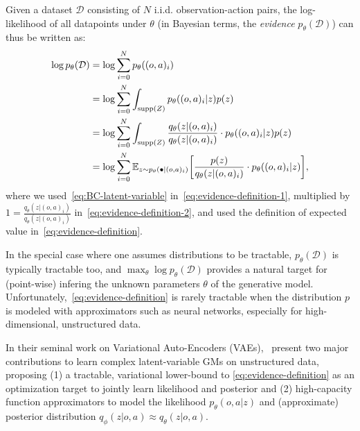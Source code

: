 Given a dataset \( \mathcal D \) consisting of \( N \) i.i.d. observation-action pairs, the log-likelihood of all datapoints under \( \theta \) (in Bayesian terms, the \emph{evidence} \( p_\theta(\mathcal D)\)) can thus be written as:
\begin{align}
    \log p_\theta(\mathcal D) &= \log \sum_{i=0}^N p_\theta ((o,a)_i) \label{eq:evidence-definition-1}\\
                              &= \log \sum_{i=0}^N \int_{\supp{Z}} p_\theta((o,a)_i \vert z) p(z) \label{eq:evidence-definition-2}\\
                              &= \log \sum_{i=0}^N \int_{\supp{Z}} \frac{q_\theta(z \vert (o,a)_i)}{q_\theta(z \vert (o,a)_i)} \cdot p_\theta((o,a)_i \vert z) p(z) \label{eq:evidence-definition-3}\\
                              &= \log \sum_{i=0}^N \mathbb E_{z \sim p_\theta(\bullet \vert (o,a)_i)} \left[ \frac{p(z)}{q_\theta(z \vert (o,a)_i)} \cdot p_\theta((o,a)_i \vert z) \right], \label{eq:evidence-definition}
\end{align}
where we used~\ref{eq:BC-latent-variable} in~\ref{eq:evidence-definition-1}, multiplied by \(1 = \frac{q_\theta(z \vert (o,a)_i)}{q_\theta(z \vert (o,a)_i)} \) in~\ref{eq:evidence-definition-2}, and used the definition of expected value in~\ref{eq:evidence-definition}.

In the special case where one assumes distributions to be tractable, \( p_\theta (\mathcal D) \) is typically tractable too, and \(\max_\theta \log p_\theta(\mathcal D) \) provides a natural target for (point-wise) infering the unknown parameters \( \theta \) of the generative model.
Unfortunately,~\ref{eq:evidence-definition} is rarely tractable when the distribution \( p \) is modeled with approximators such as neural networks, especially for high-dimensional, unstructured data.

In their seminal work on Variational Auto-Encoders (VAEs),~\citet{kingmaAutoEncodingVariationalBayes2022} present two major contributions to learn complex latent-variable GMs on unstructured data, proposing (1) a tractable, variational lower-bound to \ref{eq:evidence-definition} as an optimization target to jointly learn likelihood and posterior and (2) high-capacity function approximators to model the likelihood \(p_\theta(o,a\vert z)\) and (approximate) posterior distribution \( q_\phi(z \vert o,a) \approx q_\theta(z \vert o,a) \).

